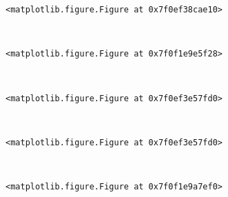 \documentclass[11pt]{article}
\begin{document}
    
    \begin{verbatim}
<matplotlib.figure.Figure at 0x7f0ef38cae10>
    \end{verbatim}

    
    \begin{center}
    \end{center}
    { \hspace*{\fill} \\}
    
    
    \begin{verbatim}
<matplotlib.figure.Figure at 0x7f0f1e9e5f28>
    \end{verbatim}

    
    \begin{center}
    \end{center}
    { \hspace*{\fill} \\}
    
    
    \begin{verbatim}
<matplotlib.figure.Figure at 0x7f0ef3e57fd0>
    \end{verbatim}

    
    \begin{center}
    \end{center}
    { \hspace*{\fill} \\}
    
    
    \begin{verbatim}
<matplotlib.figure.Figure at 0x7f0ef3e57fd0>
    \end{verbatim}

    
    \begin{center}
    \end{center}
    { \hspace*{\fill} \\}
    
    
    \begin{verbatim}
<matplotlib.figure.Figure at 0x7f0f1e9a7ef0>
    \end{verbatim}

    
    \begin{center}
    \end{center}
    { \hspace*{\fill} \\}
    
\end{document}
